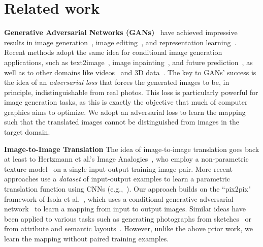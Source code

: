 \section{Related work}

{\bf Generative Adversarial Networks  (GANs)}~\cite{goodfellow2014generative,zhao2016energy} have achieved impressive results in image generation~\cite{denton2015deep,radford2015unsupervised}, image editing~\cite{zhu2016generative}, and representation learning~\cite{radford2015unsupervised,salimans2016improved,mathieu2016disentangling}.　
Recent methods adopt the same idea for conditional image generation applications, such as text2image~\cite{reed2016generative}, image inpainting~\cite{pathak2016context}, and future prediction~\cite{mathieu2015deep}, as well as to other domains like videos~\cite{vondrick2016generating} and 3D data~\cite{wu2016learning}. 
The key to GANs' success is the idea of an \textit{adversarial loss} that forces the generated images to be, in principle, indistinguishable from real photos.  
This loss is particularly powerful for image generation tasks,  
as this is exactly the objective that much of computer graphics aims to optimize.  We adopt an adversarial loss to learn the mapping such that the translated images cannot be distinguished from images in the target domain.

{\bf Image-to-Image Translation}
The idea of image-to-image translation goes back at least to Hertzmann et al.'s Image Analogies~\cite{hertzmann2001image}, who employ a non-parametric texture model~\cite{efros1999texture} on a single input-output training image pair.
More recent approaches use a \emph{dataset} of input-output examples to learn a parametric translation function using CNNs (e.g.,~\cite{long2015fully}). Our approach builds on the ``pix2pix" framework of Isola et al.~\cite{isola2016image}, which uses a conditional generative adversarial network~\cite{goodfellow2014generative} to learn a mapping from input to output images. Similar ideas have been applied to various tasks such as generating photographs from sketches~\cite{sangkloy2016scribbler} or from attribute and semantic layouts~\cite{karacan2016learning}. However, unlike the above prior work, we learn the mapping without paired training examples. 


